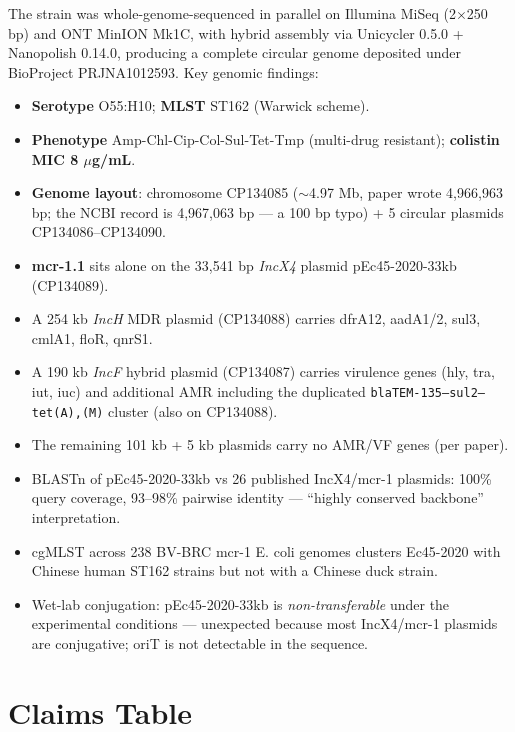 \documentclass[11pt]{article}
\begin{document}
The strain was whole-genome-sequenced in parallel on Illumina MiSeq (2$\times$250 bp) and ONT MinION
Mk1C, with hybrid assembly via Unicycler 0.5.0 + Nanopolish 0.14.0, producing a complete circular
genome deposited under BioProject PRJNA1012593. Key genomic findings:
\begin{itemize}
  \item \textbf{Serotype} O55:H10; \textbf{MLST} ST162 (Warwick scheme).
  \item \textbf{Phenotype} Amp-Chl-Cip-Col-Sul-Tet-Tmp (multi-drug resistant); \textbf{colistin MIC 8 $\mu$g/mL}.
  \item \textbf{Genome layout}: chromosome CP134085 ($\sim$4.97 Mb, paper wrote 4{,}966{,}963 bp; the NCBI record is 4{,}967{,}063 bp --- a 100 bp typo) + 5 circular plasmids CP134086--CP134090.
  \item \textbf{mcr-1.1} sits alone on the 33{,}541 bp \emph{IncX4} plasmid pEc45-2020-33kb (CP134089).
  \item A 254 kb \emph{IncH} MDR plasmid (CP134088) carries dfrA12, aadA1/2, sul3, cmlA1, floR, qnrS1.
  \item A 190 kb \emph{IncF} hybrid plasmid (CP134087) carries virulence genes (hly, tra, iut, iuc) and additional AMR including the duplicated \texttt{blaTEM-135--sul2--tet(A),(M)} cluster (also on CP134088).
  \item The remaining 101 kb + 5 kb plasmids carry no AMR/VF genes (per paper).
  \item BLASTn of pEc45-2020-33kb vs 26 published IncX4/mcr-1 plasmids: 100\% query coverage, 93--98\% pairwise identity --- ``highly conserved backbone'' interpretation.
  \item cgMLST across 238 BV-BRC mcr-1 E. coli genomes clusters Ec45-2020 with Chinese human ST162 strains but not with a Chinese duck strain.
  \item Wet-lab conjugation: pEc45-2020-33kb is \emph{non-transferable} under the experimental conditions --- unexpected because most IncX4/mcr-1 plasmids are conjugative; oriT is not detectable in the sequence.
\end{itemize}

\section{Claims Table}
\label{sec:claims}
\end{document}
